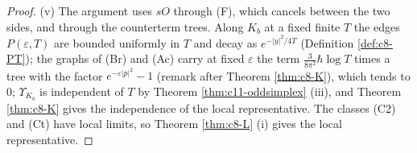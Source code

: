 \begin{proof}
(v) The argument uses $sO$ through (F), which cancels between the two sides, and through the counterterm trees. Along $K_b$ at a fixed finite $T$ the edges $P(\varepsilon,T)$ are bounded uniformly in $T$ and decay as $e^{-|y|^2/4T}$ (Definition \ref{def:c8-PT}); the graphs of (Br) and (Ac) carry at fixed $\varepsilon$ the term $\tfrac{3}{8\pi^2}\hbar\log T$ times a tree with the factor $e^{-\varepsilon|p|^2}-1$ (remark after Theorem \ref{thm:c8-K}), which tends to $0$; $\Upsilon_{K_b}$ is independent of $T$ by Theorem \ref{thm:c11-oddsimplex} (iii), and Theorem \ref{thm:c8-K} gives the independence of the local representative. The classes (C2) and (Ct) have local limits, so Theorem \ref{thm:c8-L} (i) gives the local representative.
\end{proof}

